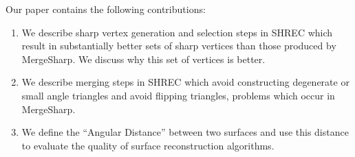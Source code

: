 

\maketitle

Our paper contains the following contributions:
\begin{enumerate}
\item We describe sharp vertex generation and selection steps
in SHREC which result in substantially better sets of sharp vertices
than those produced by MergeSharp.
We discuss why this set of vertices is better.
\item We describe merging steps in SHREC
which avoid constructing degenerate or small angle triangles and
avoid flipping triangles,
problems which occur in MergeSharp.
\item We define the ``Angular Distance'' between two surfaces
and use this distance to evaluate the quality 
of surface reconstruction algorithms.
\end{enumerate}

